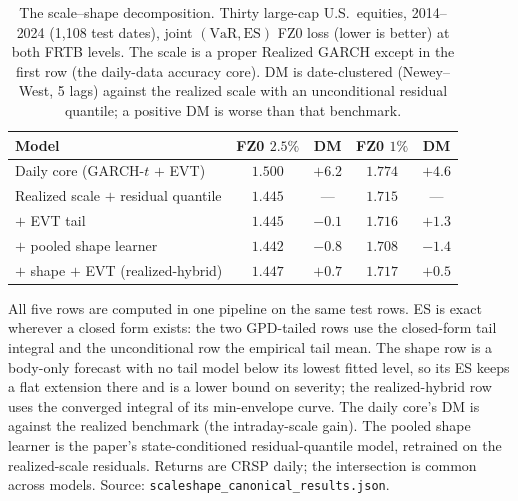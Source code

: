 \documentclass[11pt]{article}
\newcommand{\VaR}{\mathrm{VaR}}
\newcommand{\ES}{\mathrm{ES}}
\begin{document}
\begin{table}[t]
\centering
\begin{threeparttable}
\caption{The scale--shape decomposition. Thirty large-cap U.S.\ equities, 2014--2024
(1{,}108 test dates), joint $(\VaR,\ES)$ FZ0 loss (lower is better) at both FRTB
levels. The scale is a proper Realized GARCH except in the first row (the daily-data
accuracy core). DM is date-clustered (Newey--West, 5 lags) against the realized scale
with an unconditional residual quantile; a positive DM is worse than that benchmark.}
\label{tab:rgarch}
\small\setlength{\tabcolsep}{6pt}
\begin{tabular}{lcccc}
\toprule
Model & FZ0 $2.5\%$ & DM & FZ0 $1\%$ & DM \\
\midrule
Daily core (GARCH-$t$ $+$ EVT) & $1.500$ & $+6.2$ & $1.774$ & $+4.6$ \\
Realized scale $+$ residual quantile & $1.445$ & --- & $1.715$ & --- \\
\quad $+$ EVT tail & $1.445$ & $-0.1$ & $1.716$ & $+1.3$ \\
\quad $+$ pooled shape learner & $1.442$ & $-0.8$ & $1.708$ & $-1.4$ \\
\quad $+$ shape $+$ EVT (realized-hybrid) & $1.447$ & $+0.7$ & $1.717$ & $+0.5$ \\
\bottomrule
\end{tabular}
\begin{tablenotes}\footnotesize
\item All five rows are computed in one pipeline on the same test rows. ES is exact wherever a closed
form exists: the two GPD-tailed rows use the closed-form tail integral and the unconditional row the
empirical tail mean. The shape row is a body-only forecast with no tail model below its lowest fitted
level, so its ES keeps a flat extension there and is a lower bound on severity; the realized-hybrid row
uses the converged integral of its min-envelope curve. The daily core's DM is against the
realized benchmark (the intraday-scale gain). The pooled shape learner is the paper's
state-conditioned residual-quantile model, retrained on the realized-scale residuals.
Returns are CRSP daily; the intersection is common across models. Source:
\texttt{scaleshape\_canonical\_results.json}.
\end{tablenotes}
\end{threeparttable}
\end{table}

\clearpage
\end{document}

